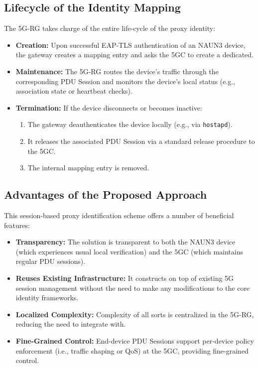\subsection{Lifecycle of the Identity Mapping}

The \ac{5G-RG} takes charge of the entire life-cycle of the proxy identity:

\begin{itemize}
    \item \textbf{Creation:} Upon successful \ac{EAP-TLS} authentication of an \ac{NAUN3} device, the gateway creates a mapping entry and asks the \ac{5GC} to create a dedicated.
    
    \item \textbf{Maintenance:} The \ac{5G-RG} routes the device’s traffic through the corresponding \ac{PDU} Session and monitors the device’s local status (e.g., association state or heartbeat checks).

    \item {
        \textbf{Termination:} If the device disconnects or becomes inactive:
        \begin{enumerate}
            \item The gateway deauthenticates the device locally (e.g., via \texttt{hostapd}).
            \item It releases the associated \ac{PDU} Session via a standard release procedure to the \ac{5GC}.
            \item The internal mapping entry is removed.
        \end{enumerate}
    }
\end{itemize}

\subsection{Advantages of the Proposed Approach}

This session-based proxy identification scheme offers a number of beneficial features:

\begin{itemize}
    \item \textbf{Transparency:} The solution is transparent to both the \ac{NAUN3} device (which experiences usual local verification) and the \ac{5GC} (which maintains regular \ac{PDU} sessions).
    \item \textbf{Reuses Existing Infrastructure:} It constructs on top of existing \ac{5G} session management without the need to make any modifications to the core identity frameworks.

    \item \textbf{Localized Complexity:} Complexity of all sorts is centralized in the \ac{5G-RG}, reducing the need to integrate with.
    
    \item \textbf{Fine-Grained Control:} End-device \ac{PDU} Sessions support per-device policy enforcement (i.e., traffic shaping or \ac{QoS}) at the \ac{5GC}, providing fine-grained control.
\end{itemize}

